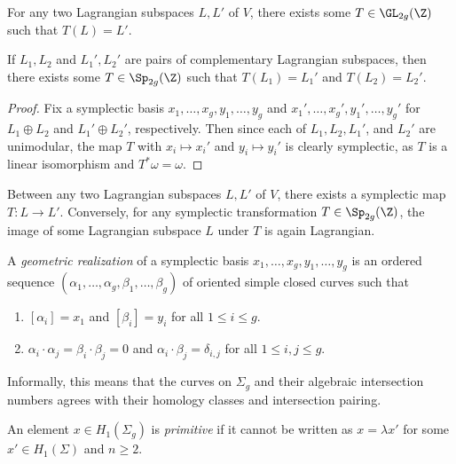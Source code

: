 \begin{corollary}
	For any two Lagrangian subspaces $L,L'$ of $V$, there exists some $T \in \GL_{2g}(\Z)$ such that $T(L) = L'$.
\end{corollary}

\begin{proposition}
	If $L_1,L_2$ and $L_1',L_2'$ are pairs of complementary Lagrangian subspaces, then there exists some $T \in \Sp_{2g}(\Z)$ such that $T(L_1) = L_1'$ and $T(L_2) = L_2'$.
\end{proposition}
\begin{proof}
	Fix a symplectic basis $x_1,\dots,x_g,y_1,\dots,y_g$ and $x_1',\dots,x_g',y_1',\dots,y_g'$ for $L_1 \oplus L_2$ and $L_1' \oplus L_2'$, respectively. Then since each of $L_1,L_2,L_1'$, and $L_2'$ are unimodular, the map $T$ with $x_i \mapsto x_i'$ and $y_i \mapsto y_i'$ is clearly symplectic, as $T$ is a linear isomorphism and $T^*\omega = \omega$.
\end{proof}

\begin{corollary}
	\label{cor:symplectic_existence}
	Between any two Lagrangian subspaces $L,L'$ of $V$, there exists a symplectic map $T: L \to L'$. Conversely, for any symplectic transformation $T \in \Sp_{2g}(\Z)$, the image of some Lagrangian subspace $L$ under $T$ is again Lagrangian.
\end{corollary}

\begin{definition}
	A \textit{geometric realization} of a symplectic basis $x_1,\dots,x_g,y_1,\dots,y_g$ is an ordered sequence $(\alpha_1,\dots,\alpha_g,\beta_1,\dots,\beta_g)$ of oriented simple closed curves such that
	\begin{enumerate}
		\item $[\alpha_i] = x_1$ and $[\beta_i] = y_i$ for all $1 \leq i \leq g$.
		\item $\alpha_i \cdot \alpha_j = \beta_i \cdot \beta_j = 0$ and $\alpha_i \cdot \beta_j = \delta_{i,j}$ for all $1 \leq i,j \leq g$.
	\end{enumerate}
	Informally, this means that the curves on $\Sigma_g$ and their algebraic intersection numbers agrees with their homology classes and intersection pairing.
\end{definition}

\begin{definition}
	An element $x \in H_1(\Sigma_g)$ is \textit{primitive} if it cannot be written as $x = \lambda x'$ for some $x' \in H_1(\Sigma)$ and $n \geq 2$. 
\end{definition}

